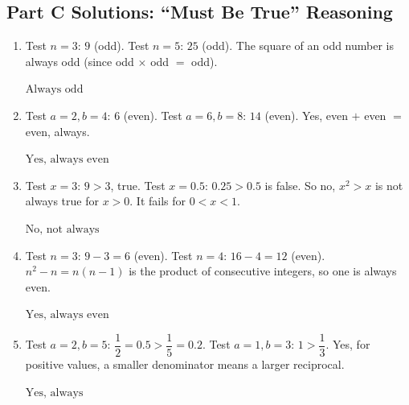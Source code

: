\documentclass[14pt]{extarticle}
\begin{document}
\subsection*{Part C Solutions: ``Must Be True'' Reasoning}
\begin{enumerate}
  \item Test \(n = 3\): \(9\) (odd). Test \(n = 5\): \(25\) (odd). The square of an odd number is always odd (since odd \(\times\) odd \(=\) odd).

  \(\boxed{\text{Always odd}}\)

  \item Test \(a = 2, b = 4\): \(6\) (even). Test \(a = 6, b = 8\): \(14\) (even). Yes, even \(+\) even \(=\) even, always.

  \(\boxed{\text{Yes, always even}}\)

  \item Test \(x = 3\): \(9 > 3\), true. Test \(x = 0.5\): \(0.25 > 0.5\) is false. So no, \(x^2 > x\) is not always true for \(x > 0\). It fails for \(0 < x < 1\).

  \(\boxed{\text{No, not always}}\)

  \item Test \(n = 3\): \(9 - 3 = 6\) (even). Test \(n = 4\): \(16 - 4 = 12\) (even). \(n^2 - n = n(n - 1)\) is the product of consecutive integers, so one is always even.

  \(\boxed{\text{Yes, always even}}\)

  \item Test \(a = 2, b = 5\): \(\dfrac{1}{2} = 0.5 > \dfrac{1}{5} = 0.2\). Test \(a = 1, b = 3\): \(1 > \dfrac{1}{3}\). Yes, for positive values, a smaller denominator means a larger reciprocal.

  \(\boxed{\text{Yes, always}}\)
\end{enumerate}
\end{document}
